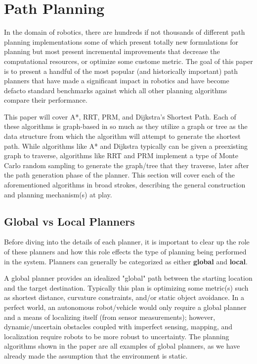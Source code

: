 \section{Path Planning}

In the domain of robotics, there are hundreds if not thousands of different path planning implementations some of which present totally new formulations for planning but most present incremental improvements that decrease the computational resources, or optimize some custome metric. The goal of this paper is to present a handful of the most popular (and historically important) path planners that have made a significant impact in robotics and have become defacto standard benchmarks against which all other planning algorithms compare their performance. 

This paper will cover A*, RRT, PRM, and Dijkstra's Shortest Path. Each of these algorithms is graph-based in so much as they utilize a graph or tree as the data structure from which the algorithm will attempt to generate the shortest path. While algorithms like A* and Dijkstra typically can be given a preexisting graph to traverse, algorithms like RRT and PRM implement a type of Monte Carlo random sampling to generate the graph/tree that they traverse, later after the path generation phase of the planner.  This section will cover each of the aforementioned algorithms in broad strokes, describing the general construction and planning mechanism(s) at play.

\subsection{Global vs Local Planners}

Before diving into the details of each planner, it is important to clear up the role of these planners and how this role effects the type of planning being performed in the system. Planners can generally be categorized as either \textbf{global} and \textbf{local}.  

A global planner provides an idealized "global" path between the starting location and the target destination. Typically this plan is optimizing some metric(s) such as shortest distance, curvature constraints, and/or static object avoidance. In a perfect world, an autonomous robot/vehicle would only require a global planner and a means of localizing itself (from sensor measurements); however, dynamic/uncertain obstacles coupled with imperfect sensing, mapping, and localization require robots to be more robust to uncertainty. The planning algorithms shown in the paper are all examples of global planners, as we have already made the assumption that the environment is static. 

